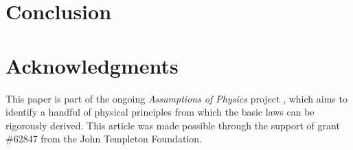 \documentclass[10pt,twocolumn, nofootinbib]{revtex4-2}
\begin{document}
\section{Conclusion}



\section*{Acknowledgments}
This paper is part of the ongoing \textit{Assumptions of Physics} project \cite{aop-book}, which aims to identify a handful of physical principles from which the basic laws can be rigorously derived. This article was made possible through the support of grant \#62847 from the John Templeton Foundation.




\newcommand{\pj}[1] {\underbar{$#1$}}
\end{document}
